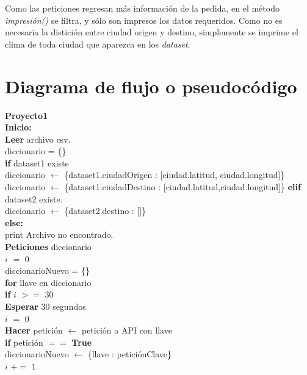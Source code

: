 \documentclass[]{article}
\begin{document}
Como las peticiones regresan más información de la pedida, en el método
\emph{impresión()} se filtra, y sólo son impresos los datos requeridos. Como 
no es necesaria la distición entre ciudad origen y destino, simplemente se 
imprime el clima de toda ciudad que aparezca en los \emph{dataset}.

\section{Diagrama de flujo o pseudocódigo}
\textbf{Proyecto1}\\
\textbf{Inicio:}\\
\indent \textbf{Leer} archivo csv.\\
\indent\indent diccionario = \{\}\\
\indent\indent \textbf{if} dataset1 existe\\
\indent\indent\indent diccionario $ \leftarrow $ \{dataset1.ciudadOrigen : 
[ciudad.latitud, ciudad.longitud]\} \\
\indent\indent\indent diccionario $ \leftarrow $ \{dataset1.ciudadDestino : 
[ciudad.latitud,ciudad.longitud]\}
\indent\indent \textbf{elif} dataset2 existe.\\
\indent\indent\indent diccionario $ \leftarrow $ \{dataset2.destino : []\}\\
\indent\indent \textbf{else:}\\
\indent\indent\indent print Archivo no encontrado.\\
\indent \textbf{Peticiones} diccionario\\
\indent\indent $ i $ $ = $ $ 0 $\\
\indent\indent diccionarioNuevo = \{\} \\
\indent\indent \textbf{for} llave en diccionario\\
\indent\indent\indent \textbf{if} $ i $ $ >= $ $ 30 $\\
\indent\indent\indent\indent \textbf{Esperar} 30 segundos\\
\indent\indent\indent\indent $ i $ $ = $ $ 0 $\\
\indent\indent\indent \textbf{Hacer} petición $ \leftarrow $ petición a API 
con llave\\
\indent\indent\indent \textbf{if} petición $ == $ \textbf{True}\\
\indent\indent\indent\indent diccionarioNuevo $ \leftarrow $ \{llave : 
peticiónClave\}\\
\indent\indent\indent\indent $ i $ $ += $ $ 1 $\\
\end{document}
